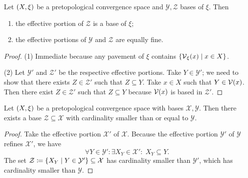 \begin{lemma}
Let $\sSet{X,\xi}$ be a pretopological convergence space and $\mathcal{Y}, \mathcal{Z}$ bases of $\xi$. Then
\begin{enumerate}
\item the effective portion of $\mathcal{Z}$ is a base of $\xi$;
\item the effective portions of $\mathcal{Y}$ and $\mathcal{Z}$ are equally fine.
\end{enumerate}
\end{lemma}
\begin{proof}
(1) Immediate because any pavement of $\xi$ contains $\setbuilder{\vicinities_\xi(x)}{x\in X}$.

(2) Let $\mathcal{Y}'$ and $\mathcal{Z}'$ be the respective effective portions. Take $Y\in \mathcal{Y}'$; we need to show that there exists $Z\in \mathcal{Z}'$ such that $Z\subseteq Y$. Take $x\in X$ such that $Y\in \operatorname{\mathcal{V}}(x)$. Then there exist $Z \in \mathcal{Z}'$ such that $Z\subseteq Y$ because $\operatorname{\mathcal{V}}(x)$ is based in $\mathcal{Z}'$. 
\end{proof}
\begin{corollary} \label{cardinalityPretopologicalBase}
Let $\sSet{X,\xi}$ be a pretopological convergence space with bases $\mathcal{X},\mathcal{Y}$. Then there exists a base $\mathcal{Z} \subseteq \mathcal{X}$ with cardinality smaller than or equal to $\mathcal{Y}$.
\end{corollary}
\begin{proof}
Take the effective portion $\mathcal{X}'$ of $\mathcal{X}$. Because the effective portion $\mathcal{Y}'$ of $\mathcal{Y}$ refines $\mathcal{X}'$, we have
\[ \forall Y\in \mathcal{Y}': \exists X_Y \in \mathcal{X}': \; X_Y\subseteq Y. \]
The set $\mathcal{Z} \defeq \setbuilder{X_Y}{Y\in \mathcal{Y}'} \subseteq \mathcal{X}$ has cardinality smaller than $\mathcal{Y}'$, which has cardinality smaller than $\mathcal{Y}$.
\end{proof}

